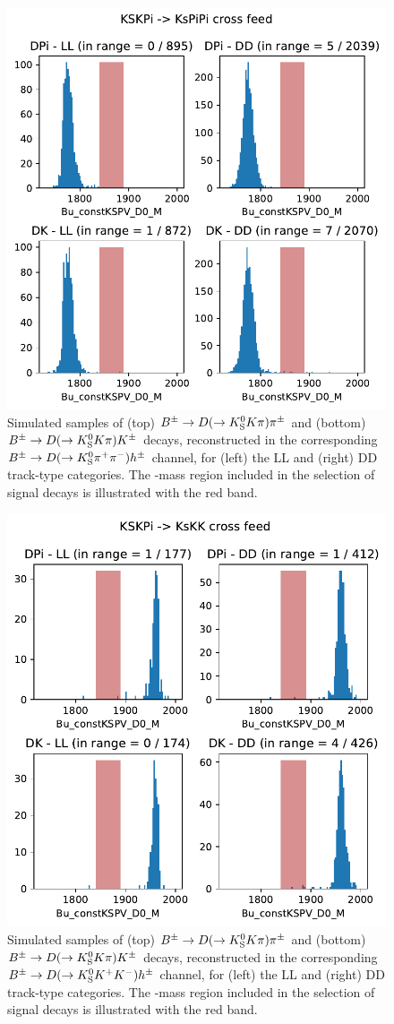 \begin{figure}[tbp]
    \centering
    \includegraphics[width=0.5\columnwidth]{figures/analysis/KsKpi_check_PiPi.pdf}
    \caption{Simulated samples of (top) ${{B}^\pm}\rightarrow{\ensuremath{D}}(\rightarrow{\ensuremath{{K}^0_{\mathrm{S}}}}{\ensuremath{K}}\pi)\pi^\pm$ and (bottom) ${{{B}^\pm}\rightarrow{\ensuremath{D}}(\rightarrow{\ensuremath{{K}^0_{\mathrm{S}}}}{\ensuremath{K}}\pi){{K}^\pm}}$ decays, reconstructed in the corresponding ${{B}^\pm}\rightarrow{\ensuremath{D}}(\rightarrow{\ensuremath{{K}^0_{\mathrm{S}}}}{\ensuremath{{\pi}^+}}{\ensuremath{{\pi}^-}})h^\pm$ channel, for (left) the LL and (right) DD track-type categories. The \D-mass region included in the selection of signal decays is illustrated with the red band.}
    \label{fig:KsKpi_pipi}
\end{figure}

\begin{figure}[tbp]
    \centering
    \includegraphics[width=0.5\columnwidth]{figures/analysis/KsKpi_check_KK.pdf}
    \caption{Simulated samples of (top) ${{B}^\pm}\rightarrow{\ensuremath{D}}(\rightarrow{\ensuremath{{K}^0_{\mathrm{S}}}}{\ensuremath{K}}\pi)\pi^\pm$ and (bottom) ${{{B}^\pm}\rightarrow{\ensuremath{D}}(\rightarrow{\ensuremath{{K}^0_{\mathrm{S}}}}{\ensuremath{K}}\pi){{K}^\pm}}$ decays, reconstructed in the corresponding ${{B}^\pm}\rightarrow{\ensuremath{D}}(\rightarrow{\ensuremath{{K}^0_{\mathrm{S}}}}{\ensuremath{{K}^+}}{\ensuremath{{K}^-}})h^\pm$ channel, for (left) the LL and (right) DD track-type categories. The \D-mass region included in the selection of signal decays is illustrated with the red band.}
    \label{fig:KsKpi_kk}
\end{figure}


